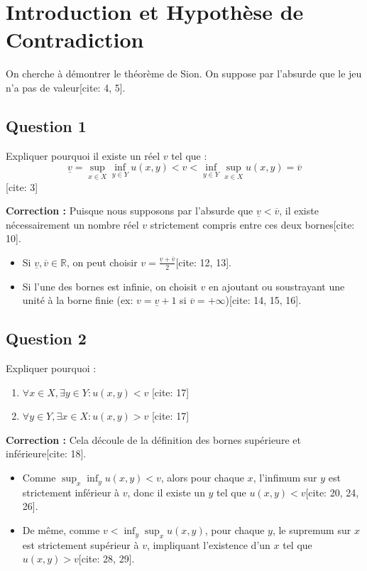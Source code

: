 \section*{Introduction et Hypothèse de Contradiction}

On cherche à démontrer le théorème de Sion. On suppose par l'absurde que le jeu n'a pas de valeur[cite: 4, 5]. 

\subsection*{Question 1}
Expliquer pourquoi il existe un réel $v$ tel que :
\[ \underline{v} = \sup_{x \in X} \inf_{y \in Y} u(x, y) < v < \inf_{y \in Y} \sup_{x \in X} u(x, y) = \overline{v} \] [cite: 3]

\textbf{Correction :}
Puisque nous supposons par l'absurde que $\underline{v} < \overline{v}$, il existe nécessairement un nombre réel $v$ strictement compris entre ces deux bornes[cite: 10]. 
\begin{itemize}
    \item Si $\underline{v}, \overline{v} \in \mathbb{R}$, on peut choisir $v = \frac{\underline{v} + \overline{v}}{2}$[cite: 12, 13].
    \item Si l'une des bornes est infinie, on choisit $v$ en ajoutant ou soustrayant une unité à la borne finie (ex: $v = \underline{v} + 1$ si $\overline{v} = +\infty$)[cite: 14, 15, 16].
\end{itemize}

\subsection*{Question 2}
Expliquer pourquoi :
\begin{enumerate}
    \item $\forall x \in X, \exists y \in Y : u(x, y) < v$ [cite: 17]
    \item $\forall y \in Y, \exists x \in X : u(x, y) > v$ [cite: 17]
\end{enumerate}

\textbf{Correction :}
Cela découle de la définition des bornes supérieure et inférieure[cite: 18]. 
\begin{itemize}
    \item Comme $\sup_{x} \inf_{y} u(x, y) < v$, alors pour chaque $x$, l'infimum sur $y$ est strictement inférieur à $v$, donc il existe un $y$ tel que $u(x, y) < v$[cite: 20, 24, 26].
    \item De même, comme $v < \inf_{y} \sup_{x} u(x, y)$, pour chaque $y$, le supremum sur $x$ est strictement supérieur à $v$, impliquant l'existence d'un $x$ tel que $u(x, y) > v$[cite: 28, 29].
\end{itemize}

